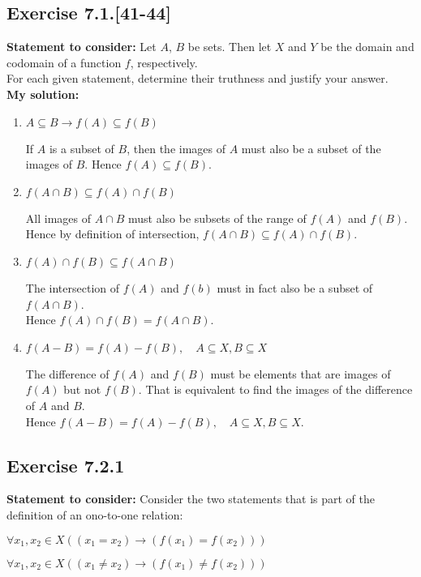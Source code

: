 \documentclass{report}
\newcommand{\cent}[1]{\begin{center}#1\end{center}}
\newcommand{\In}{\! \in \!}
\newcommand{\assignmentDescription}{\textbf{Statement to consider: }}
\newcommand{\solution}{\textbf{My solution: }}
\newcommand{\Exercise}[1]{\subsection{Exercise #1}}
\newcommand{\defaultEnumerateLabel}{\textbf{\alph*.}}
\begin{document}
 	\Exercise{7.1.[41-44]}
 	
 	\assignmentDescription
 	Let $A$, $B$ be sets. Then let $X$ and $Y$ be the domain and codomain of a function $f$, respectively.\\
 	
 	For each given statement, determine their truthness and justify your answer.\\
 	
 	\solution
 	\begin{enumerate}[label=\defaultEnumerateLabel]
 		\item $A\subseteq B \to f(A) \subseteq f(B)$
 		
 		If $A$ is a subset of $B$, then the images of $A$ must also be a subset of the images of $B$. Hence $f(A) \subseteq f(B)$.
 		
 		\item $f(A \cap B) \subseteq f(A) \cap f(B)$
 		
 		All images of $A \cap B$ must also be subsets of the range of $f(A)$ and $f(B)$.\\ 
 		
 		Hence by definition of intersection, $f(A \cap B) \subseteq f(A) \cap f(B)$.\\
 		\item $f(A) \cap f(B) \subseteq f(A \cap B)$
 		
 		The intersection of $f(A)$ and $f(b)$ must in fact also be a subset of $f(A \cap B)$.\\
 		
 		Hence $f(A) \cap f(B) = f(A \cap B)$.
 		
 		\item $ f(A-B) = f(A) - f(B), \quad A \subseteq X, B \subseteq X $
 		
 		The difference of $ f(A) $ and $f(B)$ must be elements that are images of $f(A)$ but not $f(B)$. That is equivalent to find the images of the difference of $A$ and $B$.\\ 
 		
 		Hence  $ f(A-B) = f(A) - f(B), \quad A \subseteq X, B \subseteq X $.
 	\end{enumerate}
 	
 	\Exercise{7.2.1}
 	
 	\assignmentDescription
 	Consider the two statements that is part of the definition of an ono-to-one relation:
 	
 	\cent{$\forall x_1, x_2 \In X ((x_1 = x_2) \to (f(x_1) = f(x_2) ))$}
 	\cent{$\forall x_1, x_2 \In X ((x_1 \neq x_2) \to (f(x_1) \neq f(x_2)))$}
 	
\end{document}
